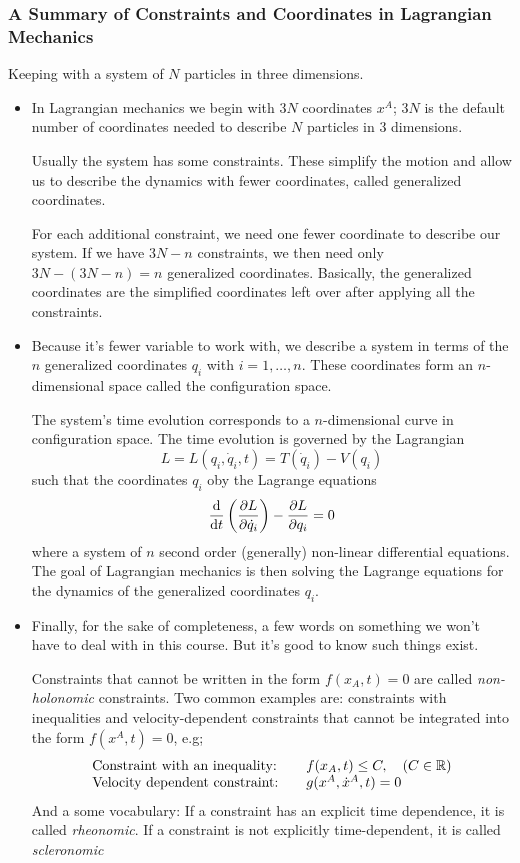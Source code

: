 \documentclass[11pt, a4paper]{article}
\newcommand{\R}{\mathbb{R}} %
\begin{document}
\subsubsection{A Summary of Constraints and Coordinates in Lagrangian Mechanics}
Keeping with a system of $ N $ particles in three dimensions.
\begin{itemize}
	\item In Lagrangian mechanics we begin with $ 3N $ coordinates $ x^{A} $; $ 3N $ is the default number of coordinates needed to describe $ N$ particles in 3 dimensions. 
	
	Usually the system has some constraints. These simplify the motion and allow us to describe the dynamics with fewer coordinates, called generalized coordinates.
	
	For each additional constraint, we need one fewer coordinate to describe our system. If we have $ 3N - n $ constraints, we then need only $ 3N - (3N - n) = n $ generalized coordinates. Basically, the generalized coordinates are the simplified coordinates left over after applying all the constraints.
	
	\item Because it's fewer variable to work with, we describe a system in terms of the $ n $ generalized coordinates $ q_i $ with $ i = 1, \ldots, n $. These coordinates form an $ n $-dimensional space called the configuration space. 
	
	The system's time evolution corresponds to a $ n $-dimensional curve in configuration space. The time evolution is governed by the Lagrangian 
	\begin{equation*}
		L = L(q_i, \dot{q}_i, t) = T(\dot{q}_i) - V(q_i)
	\end{equation*}
	such that the coordinates $ q_{i} $ oby the Lagrange equations
	\begin{equation*}
		\dv{}{t}\left(\pdv{L}{\dot{q}_i}\right) - \pdv{L}{q_i} = 0
	\end{equation*}
	where a system of $ n $ second order (generally) non-linear differential equations. The goal of Lagrangian mechanics is then solving the Lagrange equations for the dynamics of the generalized coordinates $ q_{i} $.
	
	\item Finally, for the sake of completeness, a few words on something we won't have to deal with in this course. But it's good to know such things exist.
	
	Constraints that cannot be written in the form $ f(x_{A}, t) = 0 $ are called \textit{non-holonomic} constraints. Two common examples are: constraints with inequalities and velocity-dependent constraints that cannot be integrated into the form $ f(x^{A}, t) = 0 $, e.g;
	\[
	\begin{array}{l  l}
		\text{Constraint with an inequality:} & \quad f(x_{A}, t) \leq C, \quad (C \in \R)\\
		\text{Velocity dependent constraint:} & \quad g(x^A, \dot{x}^A, t) = 0
	\end{array}
	\]
	And a some vocabulary: If a constraint has an explicit time dependence, it is called \textit{rheonomic}. If a constraint is not explicitly time-dependent, it is called \textit{scleronomic}


\end{itemize}
\end{document}
